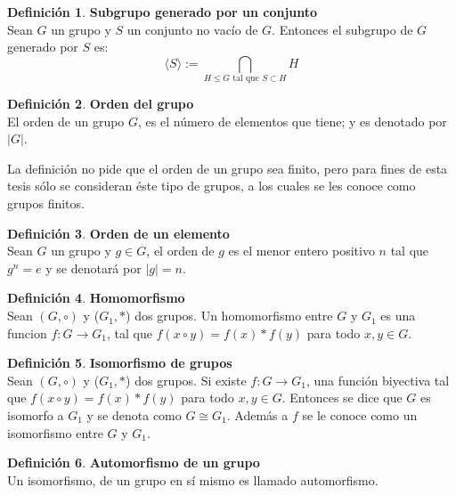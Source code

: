 \documentclass[12pt]{book}
\theoremstyle{definition}
\newtheorem{definition}{Definición}
\begin{document}
\begin{definition}\textbf{Subgrupo generado por un conjunto}\\
  Sean $G$ un grupo y $S$ un conjunto no vacío de $G$. Entonces el
  subgrupo de $G$ generado por $S$ es:
\begin{equation*}
\langle S \rangle := \bigcap_{\text{$H\le G$ tal que $S \subset H$}}H
\end{equation*}
\end{definition}

\begin{definition}\textbf{Orden del grupo}\\
  El orden de un grupo $G$, es el número de elementos que tiene; y es
  denotado por $|G|$.
\end{definition}

La definición no pide que el orden de un grupo sea finito, pero
para fines de esta tesis sólo se consideran éste tipo de grupos, a los
cuales se les conoce como grupos finitos.

\begin{definition}\textbf{Orden de un elemento}\\
  Sean $G$ un grupo y $g\in G$, el orden de $g$ es el menor entero
  positivo $n$ tal que $g^n=e$ y se denotará por $|g|=n$.
\end{definition}

\begin{definition}{\textbf{Homomorfismo}}\\ Sean $(G,\circ)$ y ($G_1, \ast$) dos grupos. 
Un homomorfismo entre $G$ y $G_1$ es una funcion $f : G \rightarrow G_1$, tal que $f(x\circ
  y)=f(x)\ast f(y)$ para todo $x,y\in G$.
\end{definition}

\begin{definition}\textbf{Isomorfismo de grupos}\\
  Sean $(G,\circ)$ y ($G_1, \ast$) dos grupos. Si existe $f : G
  \rightarrow G_1$, una función biyectiva tal que $f(x\circ
  y)=f(x)\ast f(y)$ para todo $x,y\in G$. Entonces se dice que $G$ es
  isomorfo a $G_1$ y se denota como $G\cong G_1$. Además a $f$ se le
  conoce como un isomorfismo entre $G$ y $G_1$.
\end{definition}


\begin{definition}\textbf{Automorfismo de un grupo}\\
  Un isomorfismo, de un grupo en sí mismo es llamado automorfismo.
\end{definition}
\end{document}
